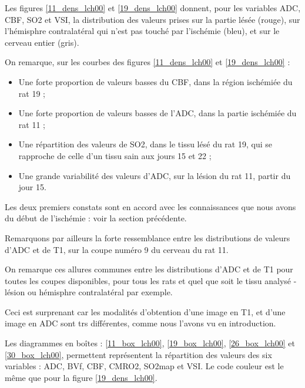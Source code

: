 \par
Les figures  \ref{11_dens_lch00} et \ref{19_dens_lch00} donnent, pour les variables ADC, CBF, SO2 et VSI, %
la distribution des valeurs prises sur la partie l\'es\'ee (rouge), %
sur l'h\'emisphre contralat\'eral qui n'est pas touch\'e par l'isch\'emie (bleu), et sur le cerveau entier (gris).

\etoile
On remarque, sur les courbes des figures \ref{11_dens_lch00} et \ref{19_dens_lch00} :

\begin{itemize}
\item Une forte proportion de valeurs basses du CBF, dans la r\'egion isch\'emi\'ee du rat 19 ;
\item Une forte proportion de valeurs basses de l'ADC, dans la partie isch\'emi\'ee du rat 11 ;
\item Une r\'epartition des valeurs de SO2, dans le tissu l\'es\'e du rat 19, qui se rapproche de celle d'un tissu sain aux jours 15 et 22 ;
\item Une grande variabilit\'e des valeurs d'ADC, sur la l\'esion du rat 11,  partir du jour 15.
\end{itemize}

\par
Les deux premiers constats sont en accord avec les connaissances que nous avons du d\'ebut de l'isch\'emie : voir la section pr\'ec\'edente.

\par
Remarquons par ailleurs la forte ressemblance entre les distributions de valeurs d'ADC et de T1, %
sur la coupe num\'ero 9 du cerveau du rat 11.

\par
On remarque ces allures communes entre les distributions d'ADC et de T1 pour toutes les coupes disponibles, %
pour tous les rats et quel que soit le tissu analys\'e -l\'esion ou h\'emisphre contralat\'eral par exemple.

\par
Ceci est surprenant car les modalit\'es d'obtention d'une image en T1, et d'une image en ADC sont trs diff\'erentes, %
comme nous l'avons vu en introduction.

\ligneinter
Les diagrammes en bo\^ites : \ref{11_box_lch00}, \ref{19_box_lch00}, \ref{26_box_lch00} et \ref{30_box_lch00}, %
permettent repr\'esentent la r\'epartition des valeurs des six variables : ADC, BVf, CBF, CMRO2, SO2map et VSI. %
Le code couleur est le m\^eme que pour la figure \ref{19_dens_lch00}.


